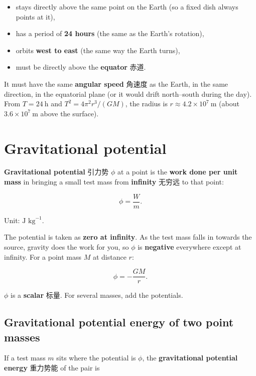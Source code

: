 \documentclass[11pt]{article}
\begin{document}
\begin{itemize}
\item stays directly above the same point on the Earth (so a fixed dish always points at it),

\item has a period of \textbf{24 hours} (the same as the Earth's rotation),

\item orbits \textbf{west to east} (the same way the Earth turns),

\item must be directly above the \textbf{equator} 赤道.

\end{itemize}

It must have the same \textbf{angular speed} 角速度 as the Earth, in the same direction, in the equatorial plane (or it would drift north–south during the day). From $T = 24\ \text{h}$ and $T^{2} = 4\pi^{2} r^{3}/(GM)$, the radius is $r \approx 4.2 \times 10^{7}\ \text{m}$ (about $3.6 \times 10^{7}\ \text{m}$ above the surface).

\section*{Gravitational potential}

\textbf{Gravitational potential} 引力势 $\phi$ at a point is the \textbf{work done per unit mass} in bringing a small test mass from \textbf{infinity} 无穷远 to that point:

\[
\phi = \frac{W}{m}.
\]

Unit: $\text{J kg}^{-1}$.

The potential is taken as \textbf{zero at infinity}. As the test mass falls in towards the source, gravity does the work for you, so $\phi$ is \textbf{negative} everywhere except at infinity. For a point mass $M$ at distance $r$:

\[
\phi = -\frac{G M}{r}.
\]

$\phi$ is a \textbf{scalar} 标量. For several masses, add the potentials.

\subsection*{Gravitational potential energy of two point masses}

If a test mass $m$ sits where the potential is $\phi$, the \textbf{gravitational potential energy} 重力势能 of the pair is
\end{document}
